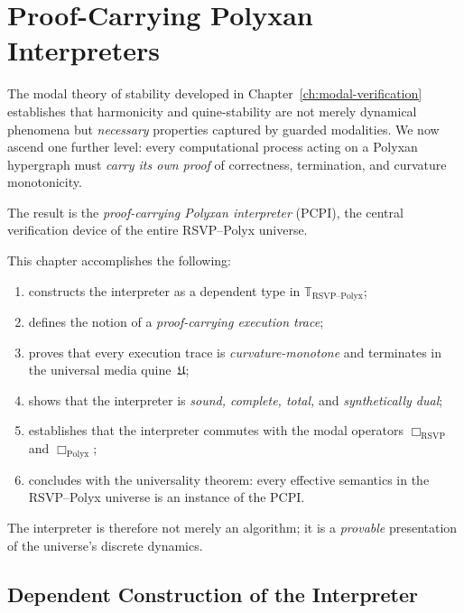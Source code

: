 \chapter{Proof-Carrying Polyxan Interpreters}
\label{ch:pcip}

The modal theory of stability developed in Chapter~\ref{ch:modal-verification}
establishes that harmonicity and quine-stability are not merely dynamical
phenomena but \emph{necessary} properties captured by guarded modalities.
We now ascend one further level: every computational process acting on a
Polyxan hypergraph must \emph{carry its own proof} of correctness,
termination, and curvature monotonicity.

The result is the \emph{proof-carrying Polyxan interpreter}
(\textsc{PCPI}), the central verification device of the entire
RSVP–Polyx universe.

This chapter accomplishes the following:

\begin{enumerate}
\item constructs the interpreter as a dependent type in
      $\mathbb{T}_{\mathrm{RSVP\text{--}Polyx}}$;
\item defines the notion of a \emph{proof-carrying execution trace};
\item proves that every execution trace is \emph{curvature-monotone}
      and terminates in the universal media quine~$\mathfrak{U}$;
\item shows that the interpreter is \emph{sound, complete, total,}
      and \emph{synthetically dual};
\item establishes that the interpreter commutes with the modal operators
      $\Box_{\mathrm{RSVP}}$ and $\Box_{\mathrm{Polyx}}$;
\item concludes with the universality theorem: every effective semantics
      in the RSVP–Polyx universe is an instance of the \textsc{PCPI}.
\end{enumerate}

\bigskip

The interpreter is therefore not merely an algorithm;  
it is a \emph{provable} presentation of the universe’s discrete dynamics.


\section{Dependent Construction of the Interpreter}
\label{sec:pcip-def}

